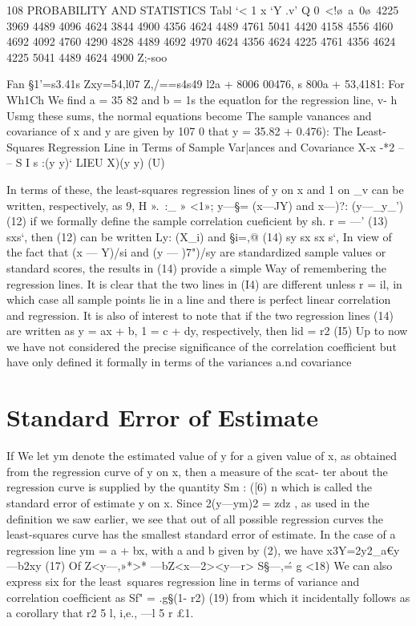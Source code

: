 108 PROBABILITY AND STATISTICS
Tabl
‘<
1
x
‘Y
.v’
Q 0~<!\o\0\a~a~0\o\
4225
3969
4489
4096
4624
3844
4900
4356
4624
4489
4761
5041
4420
4158
4556
4l60
4692
4092
4760
4290
4828
4489
4692
4970
4624
4356
4624
4225
4761
4356
4624
4225
5041
4489
4624
4900
Z;-soo {Fan §1'=s3.41s Zxy=54,l07 Z,/==s4s49
l2a + 8006
00476, s
800a + 53,4181:
For Wh1Ch We ﬁnd a = 35 82 and b =
1s the equatlon for the regression line,
v-
h
Usmg these sums, the normal equations become
The sample vanances and covariance of x and y are given by
107
0 that y = 35.82 + 0.476):
The Least-Squares Regression Line in Terms
of Sample Var|ances and Covariance
X-x -*2 -- --
S I s :(y y)‘ LIEU X)(y y) (U)


In terms of these, the least-squares regression lines of y on x and 1
on _v can be written, respectively, as
9, H
».~:_
» %
<1»;
y—§= (x—JY) and x—)?: (y—_y_') (12)
if we formally deﬁne the sample correlation cueﬁcient by
sh.
r = —' (13)
sxs‘,
then (12) can be written
Ly: (X_i) and §i=,@ (14)
sy sx sx s‘,
In view of the fact that (x — Y)/si and (y — )7")/sy are standardized
sample values or standard scores, the results in (14) provide a simple
Way of remembering the regression lines. It is clear that the two lines in
(I4) are different unless r = il, in which case all sample points lie in a
line and there is perfect linear correlation and regression.
It is also of interest to note that if the two regression lines (14) are
written as y = ax + b, 1 = c + dy, respectively, then
lid = r2 (I5)
Up to now we have not considered the precise signiﬁcance of the
correlation coefficient but have only deﬁned it formally in terms of the
variances a.nd covariance


\section{Standard Error of Estimate}
If We let ym denote the estimated value of y for a given value of x, as
obtained from the regression curve of y on x, then a measure of the scat-
ter about the regression curve is supplied by the quantity
Sm :  ([6)
n
which is called the standard error of estimate y on x. Since
2(y—ym)2 = zdz , as used in the deﬁnition we saw earlier, we see
that out of all possible regression curves the least-squares curve has the
smallest standard error of estimate.
In the case of a regression line ym = a + bx, with a and b given by
(2), we have
x3Y=2y2_a€y—b2xy (17)
Of
Z<y—,»*>* —bZ<x—2><y—r>
S§—,\' = g <18)
We can also express six for the least~squares regression line in
terms of variance and correlation coefﬁcient as
Sf" = .g§(1- r2) (19)
from which it incidentally follows as a corollary that r2 5 l, i,e., —l 5 r
£1.

}
